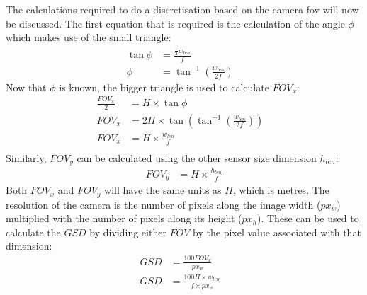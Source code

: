 The calculations required to do a discretisation based on the camera \ac{fov} will now be discussed. The first equation that is required is the calculation of the angle $\phi$ which makes use of the small triangle:
\begin{equation}
	\label{eqn:phi}
	\begin{aligned}
		\tan{\phi} &= \frac{\frac{1}{2}w_{len}}{f} &\\
		\phi &= \tan^{-1}{(\frac{w_{len}}{2f})}
	\end{aligned}	
\end{equation}
Now that $\phi$ is known, the bigger triangle is used to calculate $FOV_x$:
\begin{equation}
	\label{eqn:fov_x}
	\begin{aligned}
		\frac{FOV_x}{2} &= H \times \tan{\phi} &\\
		FOV_x &= 2H \times \tan{ (\tan^{-1}{ (\frac{w_{len}}{2f}) }) } &\\
		FOV_x &= H \times \frac{w_{len}}{f} &\\
	\end{aligned}
\end{equation}
Similarly, $FOV_y$ can be calculated using the other sensor size dimension $h_{len}$:
\begin{equation}
	\label{eqn:fov_y}
	\begin{aligned}
		FOV_y &= H \times \frac{h_{len}}{f}
	\end{aligned}
\end{equation}
Both $FOV_x$ and $FOV_y$ will have the same units as $H$, which is metres. The resolution of the camera is the number of pixels along the image width ($px_w$) multiplied with the number of pixels along its height ($px_h$). These can be used to calculate the $GSD$ by dividing either $FOV$ by the pixel value associated with that dimension:
\begin{equation}
	\label{eqn:GSD}
	\begin{aligned}
		GSD &= \frac{100FOV_x}{px_w} &\\
		GSD &= \frac{100H \times w_{len}}{f \times px_w}
	\end{aligned}
\end{equation}

